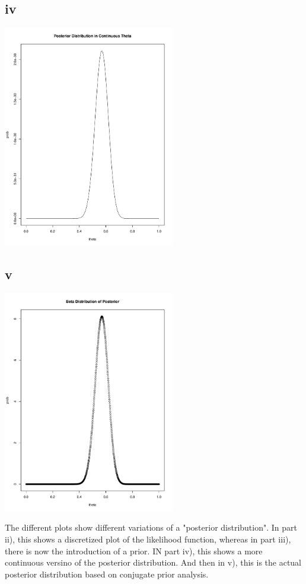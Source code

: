 \documentclass{article}
\begin{document}
\subsection{iv}
\includegraphics[width=75mm, scale=0.8]{5ivplot.pdf}

\subsection{v}
\includegraphics[width=75mm, scale=0.8]{5vplot.pdf}

The different plots show different variations of a "posterior distribution". In part ii), this shows a discretized plot of the likelihood function, whereas in part iii), there is now the introduction of a prior. IN part iv), this shows a more continuous versino of the posterior distribution. And then in v), this is the actual posterior distribution based on conjugate prior analysis.
\end{document}
